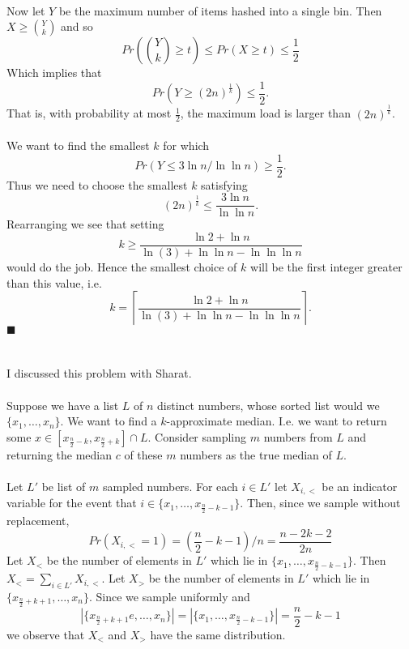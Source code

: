 \documentclass[letterpaper,12pt,oneside,onecolumn]{article}
\newcommand{\ceil}[1]{\ensuremath{\left\lceil#1\right\rceil}}
\begin{document}
\paragraph{}
Now let $Y$ be the maximum number of items hashed into a single bin. Then $X \geq {Y \choose k}$ and so
$$Pr({Y\choose k}\geq t) \leq Pr(X \geq t) \leq \frac{1}{2}$$
Which implies that 
$$Pr(Y \geq (2n)^{\frac{1}{k}}) \leq \frac{1}{2}.$$
That is, with probability at most $\frac{1}{2}$, the maximum load is larger than $(2n)^{\frac{1}{k}}$. 
\paragraph{}
We want to find the smallest $k$ for which 
$$Pr(Y \leq 3\ln n / \ln \ln n) \geq \frac{1}{2}.$$
Thus we need to choose the smallest $k$ satisfying
$$(2n)^{\frac{1}{k}} \leq \frac{3\ln n}{\ln \ln n}.$$
Rearranging we see that setting 
$$k \geq \frac{\ln2 + \ln n}{\ln(3) + \ln\ln n - \ln\ln\ln n}$$
would do the job. Hence the smallest choice of $k$ will be the first integer greater than this value, i.e.
$$k = \ceil{\frac{\ln2 + \ln n}{\ln(3) + \ln\ln n - \ln\ln\ln n}}.$$
$\blacksquare$
\newpage
\section{}
I discussed this problem with Sharat.

\paragraph{}
Suppose we have a list $L$ of $n$ distinct numbers, whose sorted list would we $\{x_1,\dots, x_n\}$. We want to find a $k$-approximate median. I.e. we want to return some $x \in [x_{\frac{n}{2} - k}, x_{\frac{n}{2} + k}]\cap L$. Consider sampling $m$ numbers from $L$ and returning the median $c$ of these $m$ numbers as the true median of $L$.
\paragraph{}
Let $L'$ be list of $m$ sampled numbers. For each $i \in L'$ let $X_{i,<}$ be an indicator variable for the event that $i \in \{x_1, \dots, x_{\frac{n}{2} -k -1}\}$. Then, since we sample without replacement,
$$Pr(X_{i, <} =1) = (\frac{n}{2} -k -1) / n = \frac{n-2k-2}{2n}$$
Let $X_<$ be the number of elements in $L'$ which lie in $\{x_1, \dots, x_{\frac{n}{2} -k -1}\}$. Then $X_< = \sum_{i \in L'} X_{i,<}$.
Let $X_>$ be the number of elements in $L'$ which lie in $\{x_{\frac{n}{2} + k + 1}, \dots, x_n\}$. Since we sample uniformly and
	$$|\{x_{\frac{n}{2} + k + 1}e, \dots, x_n\}| =  |\{x_1, \dots, x_{\frac{n}{2} -k -1}\}| = \frac{n}{2} - k - 1$$
we observe that $X_<$ and $X_>$ have the same distribution.
\end{document}
